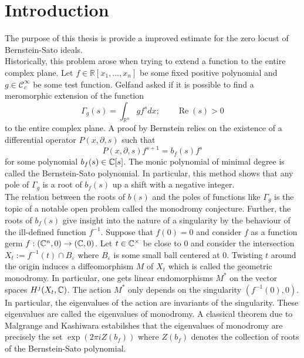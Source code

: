 \chapter*{Introduction}\label{ch: Introduction} %



The purpose of this thesis is provide a improved estimate for the zero locust of Bernstein-Sato ideals.\\

Historically, this problem arose when trying to extend a function to the entire complex plane.
Let $f\in \mathbb{R}[x_1,\ldots,x_n]$ be some fixed positive polynomial and $g \in \mathcal{C}_c^\infty$ be some test function.
Gelfand asked if it is possible to find a meromorphic extension of the function
$$\Gamma_g(s) = \int_{\mathbb{R}^n} g f^s dx; \qquad \operatorname{Re}(s)>0 $$
to the entire complex plane.
A proof by Bernstein relies on the existence of a differential operator $P(x,\partial, s)$ such that
$$P(x,\partial,s) f^{s+1} = b_f(s) f^s$$
for some polynomial $b_f(s)\in \mathbb{C}[s]$.
The monic polynomial of minimal degree is called the Bernstein-Sato polynomial.
In particular, this method shows that any pole of $\Gamma_g$ is a root of $b_f(s)$ up a shift with a negative integer.\\

The relation between the roots of $b(s)$ and the poles of functions like $\Gamma_g$ is the topic of a notable open problem called the monodromy conjecture.
Further, the roots of $b_f(s)$ give insight into the nature of a singularity by the behaviour of the ill-defined function $f^{-1}$.
Suppose that $f(0)= 0$ and consider $f$ as a function germ $f:(\mathbb{C}^n,0)\to (\mathbb{C},0)$.
Let $t\in \mathbb{C}^\times$ be close to $0$ and consider the intersection $X_t := f^{-1}(t)\cap B_\varepsilon$ where $B_\varepsilon$ is some small ball centered at $0$.
Twisting $t$ around the origin induces a diffeomorphism $M$ of $X_t$ which is called the geometric monodromy.
In particular, one gets linear endomorphisms $M^*$ on the vector spaces $H^j(X_t,\mathbb{C})$.
The action $M^*$ only depends on the singularity $(f^{-1}(0),0)$.
In particular, the eigenvalues of the action are invariants of the singularity.
These eigenvalues are called the eigenvalues of monodromy.
A classical theorem due to Malgrange and Kashiwara estabilshes that the eigenvalues of monodromy are precisely the set $\exp(2\pi i Z(b_f))$ where $Z(b_f)$ denotes the collection of roots of the Bernstein-Sato polynomial.

